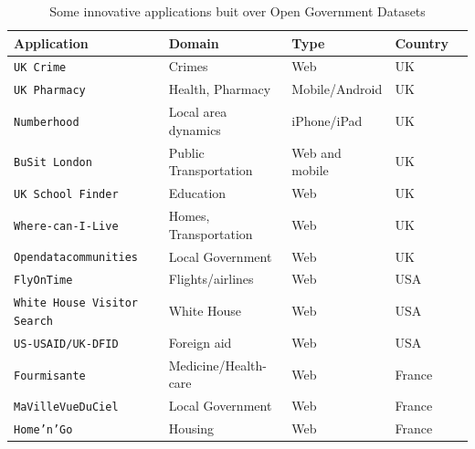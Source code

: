 \begin{table}[ht!b]
    \caption{Some innovative applications buit over Open Government Datasets} \label{tab:apps-survey}
    \small
    \center
   \begin{tabularx}{\textwidth}{@{}llllX@{}}
    \toprule
    \textbf{Application} & \textbf{Domain} & \textbf{Type} &  \textbf{Country}  \\
    \toprule
    \texttt{UK Crime} &	Crimes & Web & UK  \\
    \midrule
\texttt{UK Pharmacy} & Health, Pharmacy  & Mobile/Android  & UK \\
	\midrule
	\texttt{Numberhood} & Local area dynamics  & iPhone/iPad & UK \\
	
	\midrule
	\texttt{BuSit London} & Public Transportation  & Web and mobile  & UK \\
	
	\midrule
	\texttt{UK School Finder} & Education  & Web  & UK \\
	
	\midrule
	\texttt{Where-can-I-Live} & Homes, Transportation & Web  & UK \\
	\midrule
	
	\texttt{Opendatacommunities} & Local Government & Web  & UK \\
	\midrule
	
	\texttt{FlyOnTime } & Flights/airlines & Web  & USA \\
	\midrule
	
	\texttt{White House Visitor Search} & White House & Web  & USA \\
	\midrule
	
	\texttt{US-USAID/UK-DFID} & Foreign aid & Web  & USA \\
	\midrule
	
	\texttt{Fourmisante} & Medicine/Health-care & Web  & France \\
	\midrule
	
	\texttt{MaVilleVueDuCiel} & Local Government  & Web & France \\
	\midrule
	
	\texttt{Home'n'Go } & Housing & Web & France \\
		
    \bottomrule
    \end{tabularx}
    \end{table}

